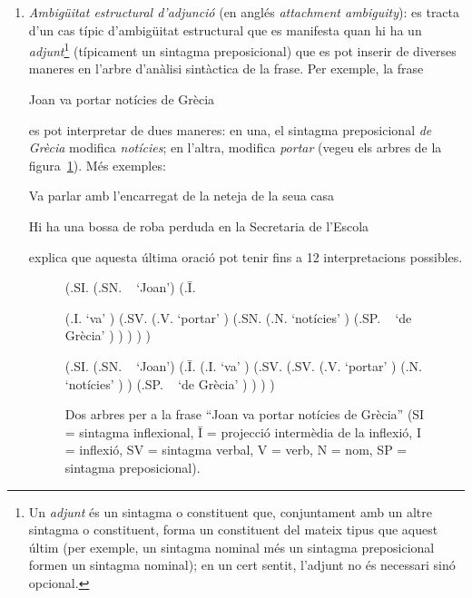 \begin{enumerate}
\item \emph{Ambigüitat estructural d'adjunció} (en anglés
  \emph{attachment ambiguity}): es tracta d'un cas típic d'ambigüitat
  estructural que es manifesta quan hi ha un {\em adjunt}\footnote{Un
    \emph{adjunt} és un sintagma o constituent que, conjuntament amb
    un altre sintagma o constituent, forma un constituent del mateix
    tipus que aquest últim (per exemple, un sintagma nominal més un
    sintagma preposicional formen un sintagma nominal); en un cert
    sentit, l'adjunt no és necessari sinó opcional.} (típicament un
  sintagma preposicional) que es pot inserir de diverses maneres en
  l'arbre d'anàlisi sintàctica de la frase.  Per exemple, la frase
  \begin{exemple}
    Joan va portar notícies de Grècia
  \end{exemple} 
  es pot interpretar de dues maneres: en una, el sintagma
  preposicional \emph{de Grècia} modifica \emph{notícies}; en l'altra,
  modifica \emph{portar} (vegeu els arbres de la
  figura~\ref{fg:noticies}).  Més exemples:
  \begin{exemple}
    Va parlar amb l'encarregat de la neteja de la seua casa
  \end{exemple}
  \begin{exemple}
    Hi ha una bossa de roba perduda en la Secretaria de l'Escola
  \label{ex:bossa}
  \end{exemple}
  \citet{tuson99b} explica que aquesta última oració pot tenir fins a
  12 interpretacions possibles.

\begin{figure}
\begin{center}
\begin{parsetree}
(.SI. (.SN. ~ `Joan')
      (.{\={I}}. 

          (.I. `va' ) 
          (.SV. 
                (.V. `portar' )
                (.SN. 
                     (.N. `notícies' ) 
                     (.SP. ~ `de Grècia' )
                )
          ) 
      ) 
) 
\end{parsetree}
\end{center}
\begin{center}
\begin{parsetree}
(.SI. (.SN. ~ `Joan') (.{\={I}}. (.I. `va' ) (.SV. (.SV. (.V. `portar' )
(.N. `notícies' ) )  (.SP. ~ `de Grècia' ) ) ) )
\end{parsetree}
\end{center}
\caption{Dos arbres per a la frase ``Joan va portar notícies de
  Grècia'' (SI = sintagma inflexional, \={I} = projecció intermèdia de
  la inflexió, I = inflexió, SV = sintagma verbal, V = verb, N = nom,
  SP = sintagma preposicional). }
\label{fg:noticies}
\end{figure}
\end{enumerate}

